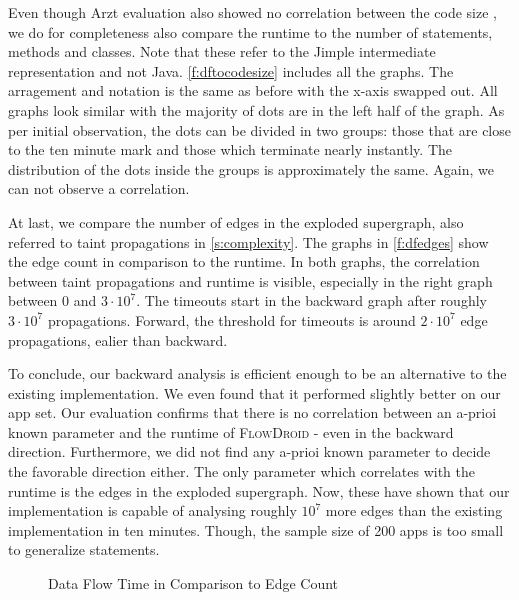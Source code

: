 \documentclass[../draft.tex]{subfiles}
\begin{document}
    Even though Arzt evaluation also showed no correlation between the code size \cite{Arzt2017PhD}, we do for completeness also compare the runtime to the number of statements, methods and classes. 
    Note that these refer to the Jimple intermediate representation and not Java. 
    \autoref{f:dftocodesize} includes all the graphs. 
    The arragement and notation is the same as before with the x-axis swapped out. 
    All graphs look similar with the majority of dots are in the left half of the graph.
    As per initial observation, the dots can be divided in two groups:
    those that are close to the ten minute mark and those which terminate nearly instantly. 
    The distribution of the dots inside the groups is approximately the same.
    Again, we can not observe a correlation.

    At last, we compare the number of edges in the exploded supergraph, also referred to taint propagations in \autoref{s:complexity}. 
    The graphs in \autoref{f:dfedges} show the edge count in comparison to the runtime. 
    In both graphs, the correlation between taint propagations and runtime is visible, especially in the right graph between $0$ and $3 \cdot 10^7$. 
    The timeouts start in the backward graph after roughly $3 \cdot 10^7$ propagations.
    Forward, the threshold for timeouts is around $2 \cdot 10^7$ edge propagations, ealier than backward.

    To conclude, our backward analysis is efficient enough to be an alternative to the existing implementation. 
    We even found that it performed slightly better on our app set. 
    Our evaluation confirms that there is no correlation between an a-prioi known parameter and the runtime of \textsc{FlowDroid} - even in the backward direction. 
    Furthermore, we did not find any a-prioi known parameter to decide the favorable direction either. 
    The only parameter which correlates with the runtime is the edges in the exploded supergraph. 
    Now, these have shown that our implementation is capable of analysing roughly $10^7$ more edges than the existing implementation in ten minutes. Though, the sample size of 200 apps is too small to generalize statements.

    \begin{figure}[ht]
        \begin{subfigure}[b]{\textwidth}
            \centering
            \begin{subfigure}[]{0.45\textwidth}
                \centering
                \resizebox{\columnwidth}{!}{
                    
                }
            \end{subfigure}
            \qquad
            \begin{subfigure}[]{0.45\textwidth}
                \centering
                \resizebox{\columnwidth}{!}{
                    
                }
            \end{subfigure}
        \end{subfigure}
        \caption{Data Flow Time in Comparison to Edge Count}
        \label{f:dfedges}
    \end{figure}
\end{document}
